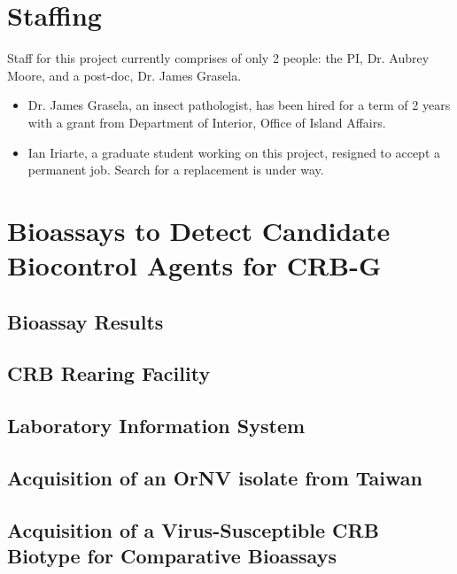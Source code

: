 \documentclass[12pt,letterpaper,english,bibliography=totocnumbered]{scrartcl}
\begin{document}
\section{Staffing}

Staff for this project currently comprises of only 2 people: the PI, Dr. Aubrey Moore, and a post-doc, Dr. James Grasela. 
\begin{itemize}

    \item Dr. James Grasela, an insect pathologist, has been hired for a term of 2 years with a grant from Department of Interior, Office of Island Affairs.

    \item Ian Iriarte, a graduate student working on this project, resigned to accept a permanent job. Search for a replacement is under way.

\end{itemize} 





\newpage
\section{Bioassays to Detect Candidate Biocontrol Agents for CRB-G}

\cite{grasela_progress_2019}

\subsection{Bioassay Results}

\subsection{CRB Rearing Facility}

\subsection{Laboratory Information System}

\subsection{Acquisition of an OrNV isolate from Taiwan}

\subsection{Acquisition of a Virus-Susceptible CRB Biotype for Comparative Bioassays}
\end{document}
